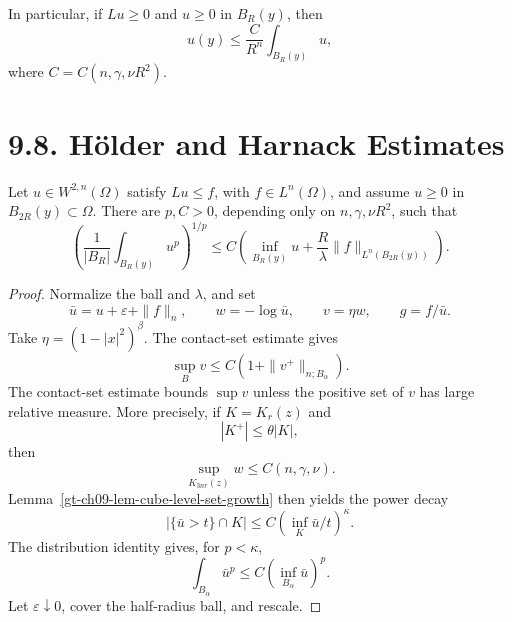 In particular, if $Lu\ge0$ and $u\ge0$ in $B_R(y)$, then
\begin{equation}\tag{9.51}
u(y)\le\frac C{R^n}\int_{B_R(y)}u,
\end{equation}
where $C=C(n,\gamma,\nu R^2)$.

\section*{9.8. H\"older and Harnack Estimates}

\begin{theorem}
\label{gt-ch09-thm-weak-harnack}
Let $u\in W^{2,n}(\Omega)$ satisfy $Lu\le f$, with $f\in L^n(\Omega)$, and
assume $u\ge0$ in $B_{2R}(y)\subset\Omega$.  There are $p,C>0$, depending
only on $n,\gamma,\nu R^2$, such that
\begin{equation}\tag{9.52}
\left(\frac1{|B_R|}\int_{B_R(y)}u^p\right)^{1/p}
\le C\left(\inf_{B_R(y)}u+\frac R\lambda
\|f\|_{L^n(B_{2R}(y))}\right).
\end{equation}
\end{theorem}
\begin{proof}
\sketch Normalize the ball and $\lambda$, and set
\begin{equation}
\tag{9.53}
\bar u=u+\varepsilon+\|f\|_n,\qquad
w=-\log\bar u,\qquad v=\eta w,\qquad g=f/\bar u.
\end{equation}
Take $\eta=(1-|x|^2)^\beta$. The contact-set estimate gives
\begin{equation}
\tag{9.54}
\sup_Bv\leq C(1+\|v^+\|_{n;B_\alpha}).
\end{equation}
The contact-set estimate bounds $\sup v$ unless the positive set of $v$ has
large relative measure. More precisely, if $K=K_r(z)$ and
\begin{equation}
\tag{9.55}
|K^+|\leq\theta|K|,
\end{equation}
then
\begin{equation}
\tag{9.56}
\sup_{K_{3nr}(z)}w\leq C(n,\gamma,\nu).
\end{equation}
Lemma~\ref{gt-ch09-lem-cube-level-set-growth} then yields the power decay
\[
|\{\bar u>t\}\cap K|\le
C(\inf_K\bar u/t)^\kappa.\tag{9.60}
\]
The distribution identity gives, for $p<\kappa$,
\begin{equation}
\tag{9.61}
\int_{B_\alpha}\bar u^p
\leq C(\inf_{B_\alpha}\bar u)^p.
\end{equation}
Let $\varepsilon\downarrow0$, cover the half-radius ball, and rescale.
\end{proof}

